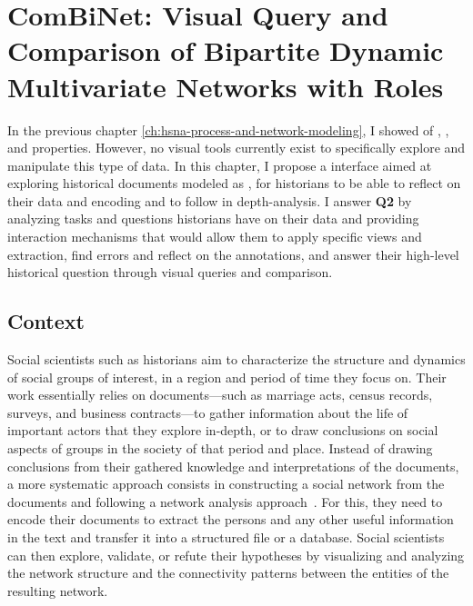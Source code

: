 \chapter{ComBiNet: Visual Query and Comparison of Bipartite Dynamic Multivariate Networks with Roles}\label{ch:combinet}
\minitoc

In the previous chapter \autoref{ch:hsna-process-and-network-modeling}, I showed  of \traceability, \reality, and \simplicity properties.
However, no visual tools currently exist to specifically explore and manipulate this type of data.
In this chapter, I propose a \va interface aimed at exploring historical documents modeled as \modelplural, for historians to be able to reflect on their data and encoding and to follow in depth-analysis.
I answer \textbf{Q2} by analyzing tasks and questions historians have on their data and providing interaction mechanisms that would allow them to apply specific views and extraction, find errors and reflect on the annotations, and answer their high-level historical question through visual queries and comparison.


\section{Context}

Social scientists such as historians aim to characterize the structure and dynamics of social groups of interest, in a region and period of time they focus on\cite{tilly1984retrieving}.
Their work essentially relies on documents---such as marriage acts, census records, surveys, and business contracts---to gather information about the life of important actors that they explore in-depth, or to draw conclusions on social aspects of groups in the society of that period and place.
Instead of drawing conclusions from their gathered knowledge and interpretations of the documents, a more systematic approach consists in constructing a social network from the documents and following a network analysis approach~\cite{wetherellHistoricalSocialNetwork1998}.
For this, they need to encode their documents to extract the persons and any other useful information in the text and transfer it into a structured file or a database.
Social scientists can then explore, validate, or refute their hypotheses by visualizing and analyzing the network structure and the connectivity patterns between the entities of the resulting network.

